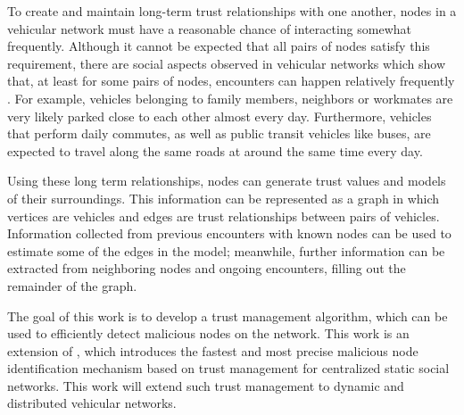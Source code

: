\documentclass[12pt]{article}
\begin{document}
To create and maintain long-term trust relationships with one another, nodes in a vehicular network must have a reasonable chance of interacting somewhat frequently.
Although it cannot be expected that all pairs of nodes satisfy this requirement, there are social aspects observed in vehicular networks which show that, at least for some pairs of nodes, encounters can happen relatively frequently \cite{cunha2014possible}.
For example, vehicles belonging to family members, neighbors or workmates are very likely parked close to each other almost every day.
Furthermore, vehicles that perform daily commutes, as well as public transit vehicles like buses, are expected to travel along the same roads at around the same time every day.

Using these long term relationships, nodes can generate trust values and models of their surroundings. 
This information can be represented as a graph in which vertices are vehicles and edges are trust relationships between pairs of vehicles.
Information collected from previous encounters with known nodes can be used to estimate some of the edges in the model; meanwhile, further information can be extracted from neighboring nodes and ongoing encounters, filling out the remainder of the graph.

The goal of this work is to develop a trust management algorithm, which can be used to efficiently detect malicious nodes on the network. 
This work is an extension of \cite{vernize2015malicious}, which introduces the fastest and most precise malicious node identification mechanism based on trust management for centralized static social networks. This work will extend such trust management to dynamic and distributed vehicular networks.

\end{document}
